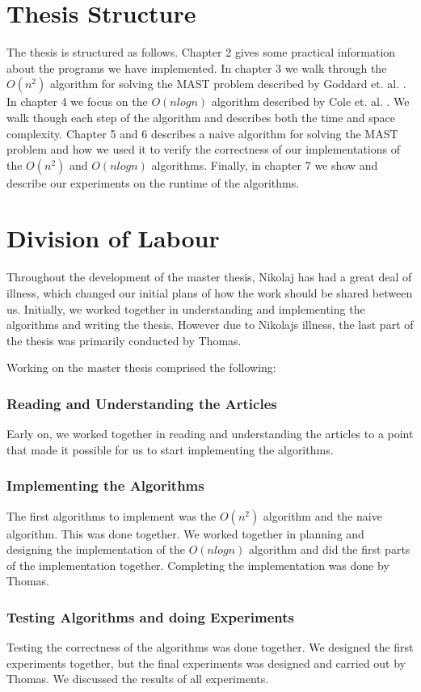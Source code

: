 \section{Thesis Structure}
The thesis is structured as follows. Chapter 2 gives some practical information about the programs we have implemented. In chapter 3 we walk through the $O(n^2)$ algorithm for solving the MAST problem described by Goddard et. al. \cite{nsquared}. In chapter 4 we focus on the $O(nlogn)$ algorithm described by Cole et. al. \cite{nlogn}. We walk though each step of the algorithm and describes both the time and space complexity. Chapter 5 and 6 describes a naive algorithm for solving the MAST problem and how we used it to verify the correctness of our implementations of the $O(n^2)$ and $O(nlogn)$ algorithms. Finally, in chapter 7 we show and describe our experiments on the runtime of the algorithms.

\section{Division of Labour}
Throughout the development of the master thesis, Nikolaj has had a great deal of illness, which changed our initial plans of how the work should be shared between us. Initially, we worked together in understanding and implementing the algorithms and writing the thesis. However due to Nikolajs illness, the last part of the thesis was primarily conducted by Thomas.

Working on the master thesis comprised the following:

\subsubsection{Reading and Understanding the Articles}
Early on, we worked together in reading and understanding the articles to a point that made it possible for us to start implementing the algorithms.

\subsubsection{Implementing the Algorithms}
The first algorithms to implement was the $O(n^2)$ algorithm and the naive algorithm. This was done together. We worked together in planning and designing the implementation of the $O(nlogn)$ algorithm and did the first parts of the implementation together. Completing the implementation was done by Thomas.

\subsubsection{Testing Algorithms and doing Experiments}
Testing the correctness of the algorithms was done together. We designed the first experiments together, but the final experiments was designed and carried out by Thomas. We discussed the results of all experiments.

